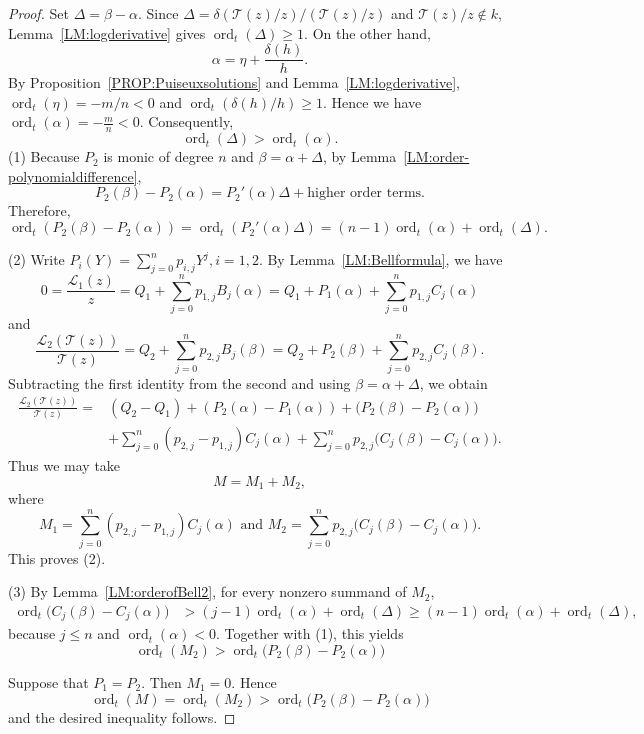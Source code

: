 \documentclass{article}
\DeclareMathOperator{\ord}{ord}
\newcommand{\calL}{{\mathcal{L}}}
\newcommand{\calT}{{\mathcal{T}}}
\begin{document}
\begin{proof}
Set $\Delta=\beta-\alpha$.
Since $\Delta=\delta(\calT(z)/z)/(\calT(z)/z)$ and $\calT(z)/z\notin k$,  Lemma~\ref{LM:logderivative} gives
$
  \ord_t(\Delta)\geq 1.
$
On the other hand,
\[
  \alpha=\eta+\frac{\delta (h)}{h}.
\]
By Proposition~\ref{PROP:Puiseuxsolutions} and 
Lemma~\ref{LM:logderivative}, $\ord_t(\eta)=-m/n<0$ and
$\ord_t(\delta(h)/h)\geq 1$. Hence we have
$
  \ord_t(\alpha)=-\frac{m}{n}<0.
$
Consequently,
$$
  \ord_t(\Delta)>\ord_t(\alpha).
$$
(1) Because $P_2$ is monic of degree $n$ and $\beta=\alpha+\Delta$, by Lemma~\ref{LM:order-polynomialdifference},
$$
   P_2(\beta)-P_2(\alpha)=P_2'(\alpha)\Delta+\text{higher order terms}.
$$
Therefore,
\[
  \ord_t(P_2(\beta)-P_2(\alpha))
  =\ord_t(P_2'(\alpha)\Delta)=(n-1)\ord_t(\alpha)+\ord_t(\Delta).
\]


(2) Write
$
  P_i(Y)=\sum_{j=0}^n p_{i,j}Y^j, i=1,2.
$
By Lemma~\ref{LM:Bellformula}, we have 
\[
  0=\frac{\calL_1(z)}{z}
   =Q_1+\sum_{j=0}^n p_{1,j}B_j(\alpha)=Q_1+P_1(\alpha)+\sum_{j=0}^n p_{1,j}C_j(\alpha)
\]
and
\[
  \frac{\calL_2(\calT(z))}{\calT(z)}
   =Q_2+\sum_{j=0}^n p_{2,j}B_j(\beta)=Q_2+P_2(\beta)+\sum_{j=0}^n p_{2,j}C_j(\beta).
\]
Subtracting the first identity from the second and using
$\beta=\alpha+\Delta$, we obtain
\[
\begin{aligned}
  \frac{\calL_2(\calT(z))}{\calT(z)}
  ={}&(Q_2-Q_1)+(P_2(\alpha)-P_1(\alpha))
     +\bigl(P_2(\beta)-P_2(\alpha)\bigr)\\
   &+\sum_{j=0}^n(p_{2,j}-p_{1,j})C_j(\alpha)
     +\sum_{j=0}^n p_{2,j}
       \bigl(C_j(\beta)-C_j(\alpha)\bigr).
\end{aligned}
\]
Thus we may take
\[
  M=M_1+M_2,
\]
where
\[
  M_1=\sum_{j=0}^n(p_{2,j}-p_{1,j})C_j(\alpha)\,\,\text{and}\,\,
  M_2=\sum_{j=0}^n p_{2,j}
       \bigl(C_j(\beta)-C_j(\alpha)\bigr).
\]
This proves (2). 


(3) By Lemma~\ref{LM:orderofBell2}, for every nonzero summand of $M_2$,
\[
\begin{aligned}
  \ord_t\bigl(C_j(\beta)-C_j(\alpha)\bigr)
  &>(j-1)\ord_t(\alpha)+\ord_t(\Delta)\geq (n-1)\ord_t(\alpha)+\ord_t(\Delta),
\end{aligned}
\]
because $j\leq n$ and $\ord_t(\alpha)<0$. Together with (1), this yields
\begin{equation}
  \label{EQ:M2}
  \ord_t(M_2)>
  \ord_t\bigl(P_2(\beta)-P_2(\alpha)\bigr)
\end{equation}

Suppose that $P_1=P_2$. Then $M_1=0$. Hence
$$
  \ord_t(M)=\ord_t(M_2)>\ord_t\bigl(P_2(\beta)-P_2(\alpha)\bigr)
$$
and the desired inequality follows. 


\end{proof}
\end{document}

